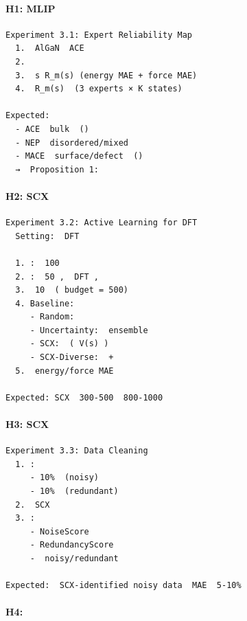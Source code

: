 \documentclass[
  12pt,
]{article}
\begin{document}
\paragraph{H1: MLIP
}\label{h1-mlip-ux4e13ux5bb6ux5728ux4e0dux540cux539fux5b50ux73afux5883ux4e0aux6709ux663eux8457ux7cbeux5ea6ux5deeux5f02}

\begin{verbatim}
Experiment 3.1: Expert Reliability Map
  1.  AlGaN  ACE 
  2. 
  3.  s R_m(s) (energy MAE + force MAE)
  4.  R_m(s)  (3 experts × K states)

Expected:
  - ACE  bulk  ()
  - NEP  disordered/mixed 
  - MACE  surface/defect  ()
  →  Proposition 1: 
\end{verbatim}

\paragraph{H2: SCX
}\label{h2-scx-ux72b6ux6001ux4ef7ux503cux5f15ux5bfcux7684ux6570ux636eux91c7ux96c6ux4f18ux4e8eux968fux673aux91c7ux96c6}

\begin{verbatim}
Experiment 3.2: Active Learning for DFT
  Setting:  DFT 

  1. :  100 
  2. :  50 ,  DFT , 
  3.  10  ( budget = 500)
  4. Baseline:
     - Random: 
     - Uncertainty:  ensemble 
     - SCX:  ( V(s) )
     - SCX-Diverse:  + 
  5.  energy/force MAE

Expected: SCX  300-500  800-1000 
\end{verbatim}

\paragraph{H3: SCX
}\label{h3-scx-ux56dbux5206ux7c7bux8bc6ux522bux4f4eux8d28ux91cfux6570ux636e}

\begin{verbatim}
Experiment 3.3: Data Cleaning
  1. :
     - 10%  (noisy)
     - 10%  (redundant)
  2.  SCX 
  3. :
     - NoiseScore 
     - RedundancyScore 
     -  noisy/redundant 

Expected:  SCX-identified noisy data  MAE  5-10%
\end{verbatim}

\paragraph{H4:
}\label{h4-ux72b6ux6001ux6761ux4ef6ux8defux7531ux4f18ux4e8eux5168ux5c40ux6df7ux5408}
\end{document}
